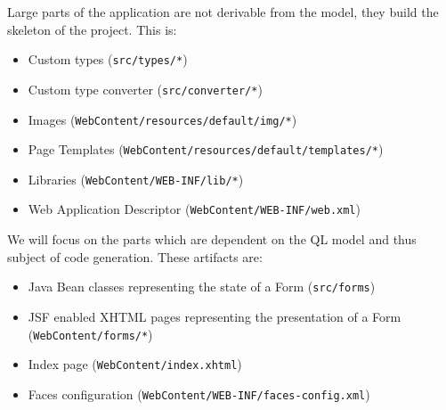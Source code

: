 Large parts of the application are not derivable from the model, they build the skeleton of the project. This is:
\begin{itemize}
\item Custom types (\texttt{src/types/*})
\item Custom type converter (\texttt{src/converter/*})
\item Images (\texttt{WebContent/resources/default/img/*})
\item Page Templates (\texttt{WebContent/resources/default/templates/*})
\item Libraries (\texttt{WebContent/WEB-INF/lib/*})
\item Web Application Descriptor (\texttt{WebContent/WEB-INF/web.xml})
\end{itemize}

We will focus on the parts which are dependent on the QL model and thus subject of code generation. These artifacts are:
\begin{itemize}
\item Java Bean classes representing the state of a Form (\texttt{src/forms})
\item JSF enabled XHTML pages representing the presentation of a Form (\texttt{WebContent/forms/*})
\item Index page (\texttt{WebContent/index.xhtml})
\item Faces configuration (\texttt{WebContent/WEB-INF/faces-config.xml})
\end{itemize}


